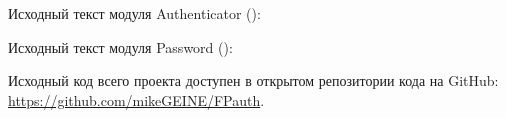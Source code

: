 \documentclass[a4paper, 12pt]{article}
\begin{document}
  \author{М.А. Гейне}
  \bmstutitle

  \large Исходный текст модуля Authenticator ():

  \normalsize

  \large Исходный текст модуля Password ():

  \normalsize



  \large Исходный код всего проекта доступен в открытом репозитории кода на GitHub: \url{https://github.com/mikeGEINE/FPauth}.
\end{document}
